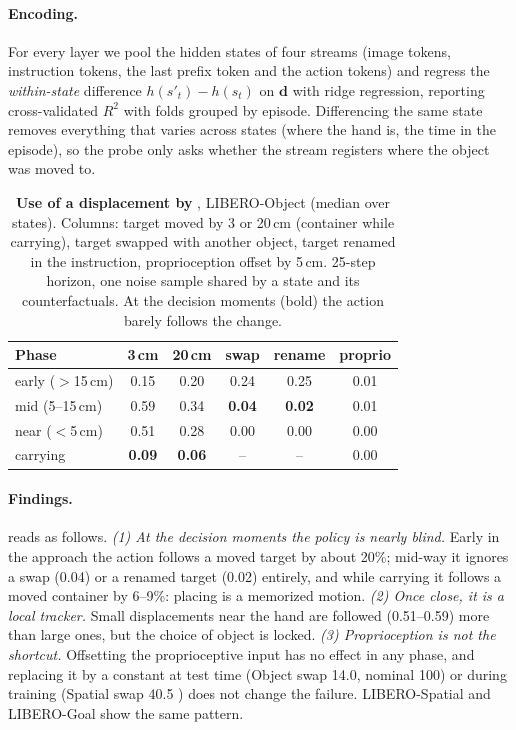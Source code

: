 \paragraph{Encoding.}
For every layer we pool the hidden states of four streams (image tokens, instruction tokens, the last prefix token and the
action tokens) and regress the \emph{within-state} difference $h(s'_t) - h(s_t)$ on $\mathbf{d}$ with ridge regression,
reporting cross-validated $R^2$ with folds grouped by episode.
Differencing the same state removes everything that varies across states (where the hand is, the time in the episode),
so the probe only asks whether the stream registers where the object was moved to.

\begin{table}[t]
\centering
\small
\setlength{\tabcolsep}{4pt}
\begin{tabular}{lccccc}
\toprule
Phase & 3\,cm & 20\,cm & swap & rename & proprio \\
\midrule
early ($>$15\,cm) & 0.15 & 0.20 & 0.24 & 0.25 & 0.01 \\
mid (5--15\,cm) & 0.59 & 0.34 & \textbf{0.04} & \textbf{0.02} & 0.01 \\
near ($<$5\,cm) & 0.51 & 0.28 & 0.00 & 0.00 & 0.00 \\
carrying & \textbf{0.09} & \textbf{0.06} & -- & -- & 0.00 \\
\bottomrule
\end{tabular}
\caption{\textbf{Use of a displacement by \pizf}, LIBERO-Object (median over states). Columns: target moved by 3 or
20\,cm (container while carrying), target swapped with another object, target renamed in the instruction, proprioception
offset by 5\,cm. 25-step horizon, one noise sample shared by a state and its counterfactuals. At the decision moments
(bold) the action barely follows the change.}
\label{tab:use_base}
\end{table}

\paragraph{Findings.}
 reads as follows.
\emph{(1) At the decision moments the policy is nearly blind.}
Early in the approach the action follows a moved target by about 20\%; mid-way it ignores a swap (0.04) or a renamed
target (0.02) entirely, and while carrying it follows a moved container by 6--9\%: placing is a memorized motion.
\emph{(2) Once close, it is a local tracker.}
Small displacements near the hand are followed (0.51--0.59) more than large ones, but the choice of object is locked.
\emph{(3) Proprioception is not the shortcut.}
Offsetting the proprioceptive input has no effect in any phase, and replacing it by a constant at test time (Object swap
14.0, nominal 100) or during training (Spatial swap 40.5 ) does not change the failure.
LIBERO-Spatial and LIBERO-Goal show the same pattern.

